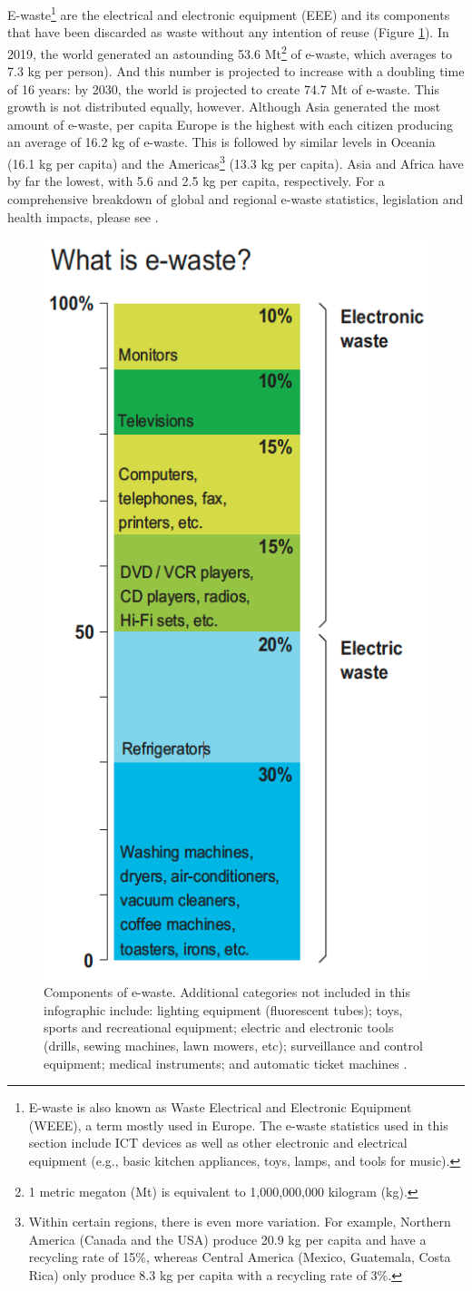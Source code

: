 \documentclass{article}
\begin{document}
E-waste\footnote{E-waste is also known as Waste Electrical and Electronic Equipment (WEEE), a term mostly used in Europe. The e-waste statistics used in this section include ICT devices as well as other electronic and electrical equipment (e.g., basic kitchen appliances, toys, lamps, and tools for music).} are the electrical and electronic equipment (EEE) and its components that have been discarded as waste without any intention of reuse (Figure \ref{e-waste}). In 2019, the world generated an astounding 53.6 Mt\footnote{1 metric megaton (Mt) is equivalent to 1,000,000,000 kilogram (kg).} of e-waste, which averages to 7.3 kg per person). And this number is projected to increase with a doubling time of 16 years: by 2030, the world is projected to create 74.7 Mt of e-waste. This growth is not distributed equally, however. Although Asia generated the most amount of e-waste, per capita Europe is the highest with each citizen producing an average of 16.2 kg of e-waste. This is followed by similar levels in Oceania (16.1 kg per capita) and the Americas\footnote{Within certain regions, there is even more variation. For example, Northern America (Canada and the USA) produce 20.9 kg per capita and have a recycling rate of 15\%, whereas Central America (Mexico, Guatemala, Costa Rica) only produce 8.3 kg per capita with a recycling rate of 3\%.} (13.3 kg per capita). Asia and Africa have by far the lowest, with 5.6 and 2.5 kg per capita, respectively. For a comprehensive breakdown of global and regional e-waste statistics, legislation and health impacts, please see \cite{forti2020global}.

\begin{figure}[h]
    \includegraphics[width=.35 \textwidth]{./images/e-waste.png}
    \centering
    \caption{Components of e-waste. Additional categories not included in this infographic include: lighting equipment (fluorescent tubes); toys, sports and recreational equipment; electric and electronic tools (drills, sewing machines, lawn mowers, etc); surveillance and control equipment; medical instruments; and automatic ticket machines \cite{bournay2006vital}.}
    \label{e-waste}
\end{figure}
\end{document}
